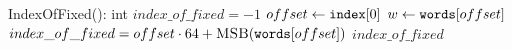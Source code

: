 \PROCEDURE IndexOfFixed(): int
\STATE $index\_of\_fixed = -1$
  \STATE $offset \leftarrow \texttt{index}[0]$
  \STATE $w \leftarrow \texttt{words}[offset]$
    \STATE $index\_of\_fixed = offset \cdot 64 + \textsc{MSB}(\texttt{words}[offset])$
  \ENDIF
\ELSE
  \RETURN $index\_of\_fixed$
\ENDIF